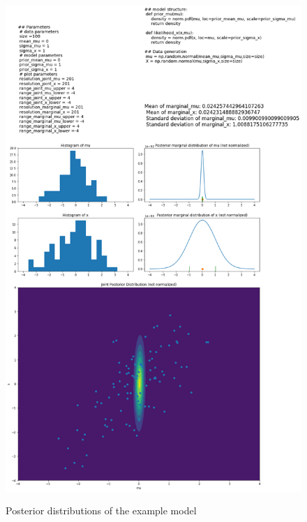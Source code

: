 \documentclass{article}
\begin{document}
\begin{figure}
	\includegraphics[width=\textwidth]{images/ground_truth_posterior_1.png}
	\label{fig:ground_truth_posterior_1}
	\caption[Posterior distributions of the example model]{Posterior distributions of the example model}
\end{figure}

%
%
\end{document}
